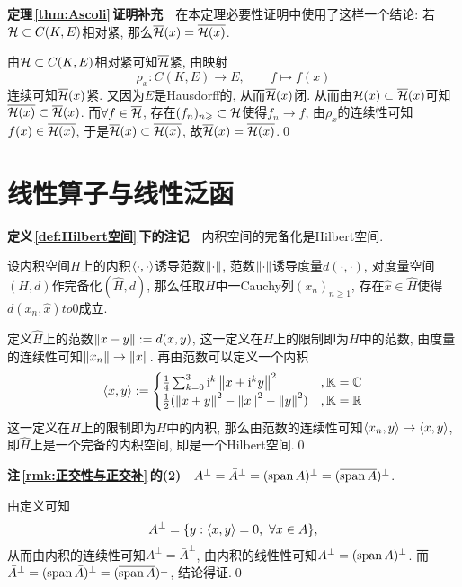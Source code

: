 \begin{appendix}
	\textbf{定理\,\ref{thm:Ascoli}\,证明补充}\ \ 在本定理必要性证明中使用了这样一个结论: 若$ \mathcal{H}\subset C(K,E) $相对紧, 那么$ \overline{\mathcal{H}}(x)=\overline{\mathcal{H}(x)} $.
	\begin{Proof}
	由$ \mathcal{H}\subset C(K,E) $相对紧可知$ \overline{\mathcal{H}} $紧, 由映射
	\[
	\rho_x : C(K,E)\to E,\qquad f\mapsto f(x)
	\]
	连续可知$ \overline{\mathcal{H}}(x) $紧. 又因为$ E $是Hausdorff的, 从而$ \overline{\mathcal{H}}(x) $闭. 从而由$ \mathcal{H}(x)\subset\overline{\mathcal{H}}(x) $可知$ \overline{\mathcal{H}(x)}\subset\overline{\mathcal{H}}(x) $. 而$ \forall f\in\overline{\mathcal{H}} $, 存在$ (f_n)_{n\geqslant}\subset\mathcal{H} $使得$ f_n\to f $, 由$ \rho_x $的连续性可知$ f(x)\in\overline{\mathcal{H}(x)} $, 于是$ \overline{\mathcal{H}}(x)\subset\overline{\mathcal{H}(x)} $, 故$ \overline{\mathcal{H}}(x)=\overline{\mathcal{H}(x)} $.\qed
	\end{Proof}
	
	\section{线性算子与线性泛函}
	
	\textbf{定义\,\ref{def:Hilbert空间}\,下的注记}\ \ 内积空间的完备化是Hilbert空间.
	\begin{Proof}
	设内积空间$ H $上的内积$ \left\langle \cdot,\cdot \right\rangle $诱导范数$ \left\| \cdot \right\| $, 范数$ \left\| \cdot \right\| $诱导度量$ d(\cdot,\cdot) $, 对度量空间$ (H,d) $作完备化$ (\hat{H},d) $, 那么任取$ H $中一Cauchy列$ (x_n)_{n\geqslant 1} $, 存在$ \hat{x}\in\hat{H} $使得$ d(x_n,\hat{x})to 0 $成立.
	
	定义$ \hat{H} $上的范数$ \left\| x-y \right\|:=d(x,y) $, 这一定义在$ H $上的限制即为$ H $中的范数, 由度量的连续性可知$ \left\| x_n \right\|\to\left\| x \right\| $. 再由范数可以定义一个内积
	\[
	\left\langle x,y \right\rangle:=\begin{cases}
	\frac{1}{4}\sum_{k=0}^3\mathrm{i}^k\left\| x+\mathrm{i}^ky \right\|^2 & ,\mathbb{K}=\mathbb{C}\\
	\frac{1}{2}(\left\| x+y \right\|^2-\left\| x \right\|^2-\left\| y \right\|^2) & ,\mathbb{K}=\mathbb{R}
	\end{cases}
	\]
	这一定义在$ H $上的限制即为$ H $中的内积, 那么由范数的连续性可知$ \left\langle x_n,y \right\rangle\to\left\langle x,y \right\rangle $, 即$ \hat{H} $上是一个完备的内积空间, 即是一个Hilbert空间.\qed
	\end{Proof}
	
	\textbf{注\,\ref{rmk:正交性与正交补}\,的(2)}\ \ $ A^\bot=\bar{A}^\bot=(\operatorname{span} A)^\bot=(\overline{\operatorname{span} A})^\bot $.
	\begin{Proof}
	由定义可知
	\[
	A^\bot=\{ y : \left\langle x,y \right\rangle=0,\ \forall x\in A \},
	\]
	从而由内积的连续性可知$ A^\bot=\bar{A}^\bot $, 由内积的线性性可知$ A^\bot=(\operatorname{span} A)^\bot $. 而$ \bar{A}^\bot=(\operatorname{span} \bar{A})^\bot=(\overline{\operatorname{span} A})^\bot $, 结论得证.\qed
	\end{Proof}
	
\end{appendix}